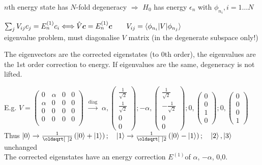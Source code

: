 \begin{squishlist}
    \item $n$th energy state has $N$-fold degeneracy $\Rightarrow$ $H_0$ has energy $\epsilon_n$ with $\phi_{n_i}, i=1 \ldots N$
    \item $\sum_j V_{ij}c_j = E_n^{(1)}c_i \Longleftrightarrow \hat{V} \mbox{\boldmath$c$} = E_n^{(1)} \mbox{\boldmath$c$} \qquad V_{ij} = \braket{\phi_{n_i} | V | \phi_{n_j}}$ \\ 
    eigenvalue problem, must diagonalise $V$ matrix (in the degenerate subspace only!)
    \item The eigenvectors are the corrected eigenstates (to 0th order), the eigenvalues are the 1st order correction to energy. If eigenvalues are the same, degeneracy is not lifted.
    \item E.g. $V = \begin{pmatrix}
        0 & \alpha & 0 & 0 \\
        \alpha  & 0 & 0 & 0 \\
        0 & 0 & 0 & 0 \\
        0 & 0 & 0 & 0 \\
    \end{pmatrix}$ $\overset{\text{diag}}{\longrightarrow}$ 
    $\alpha,  \begin{pmatrix} \frac{1}{\sqrt{2}} \\ \frac{1}{\sqrt{2}} \\ 0 \\ 0 \end{pmatrix};
    - \alpha,  \begin{pmatrix} \frac{1}{\sqrt{2}} \\ -\frac{1}{\sqrt{2}} \\ 0 \\ 0 \end{pmatrix};
    0,  \begin{pmatrix} 0 \\ 0 \\ 1 \\ 0 \end{pmatrix};
    0,  \begin{pmatrix} 0 \\ 0 \\ 0 \\ 1 \end{pmatrix} $\\
    Thus $\ket{0} \rightarrow \frac{1}{\sqrt{2}}\left( \ket{0} + \ket{1}\right);\quad \ket{1} \rightarrow \frac{1}{\sqrt{2}}\left( \ket{0} - \ket{1}\right); \quad \ket{2},\ket{3}$ unchanged\\
    The corrected eigenstates have an energy correction $E^{(1)}$of $\alpha$, $-\alpha$, 0,0.
\end{squishlist}


